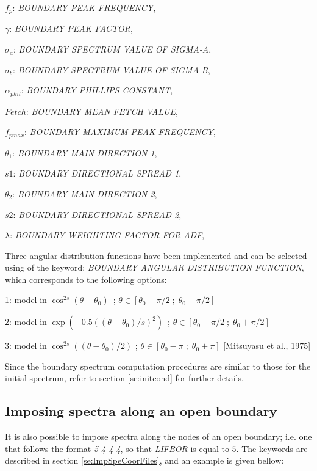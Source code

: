  $f_p$:  \textit{BOUNDARY PEAK FREQUENCY},

 $\gamma$:  \textit{BOUNDARY PEAK FACTOR},

 $\sigma_a$:  \textit{BOUNDARY SPECTRUM VALUE OF SIGMA-A},

 $\sigma_b$:  \textit{BOUNDARY SPECTRUM VALUE OF SIGMA-B},

 $\alpha_{phil}$:  \textit{BOUNDARY PHILLIPS CONSTANT},

 $Fetch$:  \textit{BOUNDARY MEAN FETCH VALUE},

 $f_{pmax}$:  \textit{BOUNDARY MAXIMUM PEAK FREQUENCY},

 $\theta_1$:  \textit{BOUNDARY MAIN DIRECTION 1},

 $s1$:  \textit{BOUNDARY DIRECTIONAL SPREAD 1},

 $\theta_2$:  \textit{BOUNDARY MAIN DIRECTION 2},

 $s2$:  \textit{BOUNDARY DIRECTIONAL SPREAD 2},

 $\lambda$:  \textit{BOUNDARY WEIGHTING FACTOR FOR ADF},

 Three angular distribution functions have been implemented and can be selected using of the keyword: \textit{BOUNDARY ANGULAR DISTRIBUTION FUNCTION}, which corresponds to the following options:

 1:  model in $\cos ^{2s} (\theta -\theta _{0} )$~; $\theta \in \left[\theta _{0} -\pi /2\; ;\; \theta _{0} +\pi /2\right]$

 2:  model in $\exp \left(-0.5\left(\left(\theta -\theta _{0} \right)/s\right)^{2} \right)$~; $\theta \in \left[\theta _{0} -\pi /2\; ;\; \theta _{0} +\pi /2\right]$

 3:  model in $\cos ^{2s} \left(\left(\theta -\theta _{0} \right)/2\right)$ ; $\theta \in \left[\theta _{0} -\pi \; ;\; \theta _{0} +\pi \right]$ [Mitsuyasu et al., 1975]

 Since the boundary spectrum computation procedures are similar to those for the initial spectrum, refer to section \ref{se:initcond} for further details.

\subsection{ Imposing spectra along an open boundary}

It is also possible to impose spectra along the nodes of an open boundary; i.e. one that follows the format \textit{5 4 4 4}, so that \textit{LIFBOR} is equal to $5$. The keywords are described in section \ref{se:ImpSpeCoorFiles}, and an example is given bellow:

